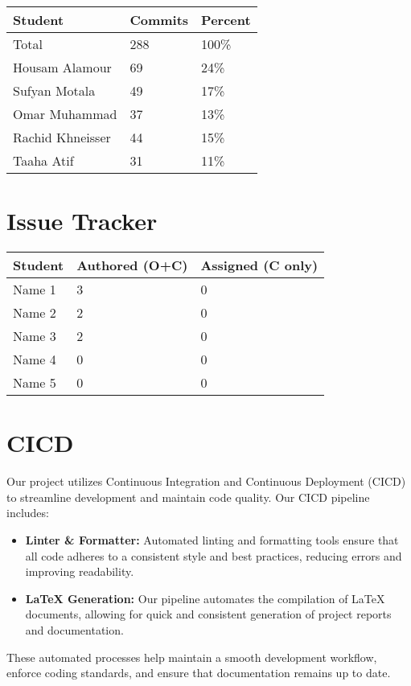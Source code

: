 \documentclass{article}
\begin{document}
\begin{table}[H]
\centering
\begin{tabular}{lll}
\toprule
\textbf{Student} & \textbf{Commits} & \textbf{Percent}\\
\midrule
Total & 288 & 100\% \\
Housam Alamour & 69 & 24\% \\
Sufyan Motala & 49 & 17\% \\
Omar Muhammad & 37 & 13\% \\
Rachid Khneisser & 44 & 15\% \\
Taaha Atif & 31 & 11\% \\
\bottomrule
\end{tabular}
\end{table}

\section{Issue Tracker}

\begin{table}[H]
\centering
\begin{tabular}{lll}
\toprule
\textbf{Student} & \textbf{Authored (O+C)} & \textbf{Assigned (C only)}\\
\midrule
Name 1 & 3 & 0 \\
Name 2 & 2 & 0 \\
Name 3 & 2 & 0 \\
Name 4 & 0 & 0 \\
Name 5 & 0 & 0 \\
\bottomrule
\end{tabular}
\end{table}


\section{CICD}

Our project utilizes Continuous Integration and Continuous Deployment (CICD) to streamline development and maintain code quality. Our CICD pipeline includes:

\begin{itemize}
    \item \textbf{Linter \& Formatter:} Automated linting and formatting tools ensure that all code adheres to a consistent style and best practices, reducing errors and improving readability.
    \item \textbf{LaTeX Generation:} Our pipeline automates the compilation of LaTeX documents, allowing for quick and consistent generation of project reports and documentation.
\end{itemize}

These automated processes help maintain a smooth development workflow, enforce coding standards, and ensure that documentation remains up to date.
\end{document}
